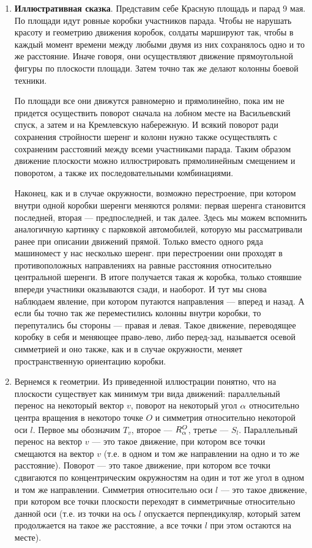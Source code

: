 \begin{enumerate}\setlength{\itemsep}{1pt}
\item \textbf{Иллюстративная сказка}. Представим себе Красную площадь и парад 9 мая. По площади идут ровные коробки участников парада. Чтобы не нарушать красоту и геометрию движения коробок, солдаты маршируют так, чтобы в каждый момент времени между любыми двумя из них сохранялось одно и то же расстояние. Иначе говоря, они осуществляют движение прямоугольной фигуры по плоскости площади. Затем точно так же делают колонны боевой техники.

По площади все они движутся равномерно и прямолинейно, пока им не придется осуществить поворот сначала на лобном месте на Васильевский спуск, а затем и на Кремлевскую набережную. И всякий поворот ради сохранения стройности шеренг и колонн нужно также осуществлять с сохраненим расстояний между всеми участниками парада. Таким образом движение плоскости можно иллюстрировать прямолинейным смещением и поворотом, а также их последовательными комбинациями.

Наконец, как и в случае окружности, возможно перестроение, при котором внутри одной коробки шеренги меняются ролями: первая шеренга становится последней, вторая --- предпоследней, и так далее. Здесь мы можем вспомнить аналогичную картинку с парковкой автомобилей, которую мы рассматривали ранее при описании движений прямой. Только вместо одного ряда машиномест у нас несколько шеренг. при перестроении они проходят в противоположных направлениях на равные расстояния относительно центральной шеренги. В итоге получается такая ж коробка, только стоявшие впереди участники оказываются сзади, и наоборот. И тут мы снова наблюдаем явление, при котором путаются направления --- вперед и назад. А если бы точно так же переместились колонны внутри коробки, то перепутались бы стороны --- правая и левая. Такое движение, переводящее коробку в себя и меняющее право-лево, либо перед-зад, называется осевой симметрией и оно также, как и в случае окружности, меняет пространственную ориентацию коробки.

\item Вернемся к геометрии.
Из приведенной иллюстрации понятно, что на плоскости существует как минимум три вида движений: параллельный перенос на некоторый вектор $v$, поворот на некоторый угол $\alpha$ относительно центра вращения в некоторо точке $O$ и симметрия относительно некоторой оси $l$. Первое мы обозначим $T_v$, второе --- $R^O_\alpha$, третье --- $S_l$. Параллельный перенос на вектор $v$ --- это такое движение, при котором все точки смещаются на вектор $v$ (т.е. в одном и том же направлении на одно и то же расстояние). Поворот --- это такое движение, при котором все точки сдвигаются по концентрическим окружностям на один и тот же угол в одном и том же направлении. Симметрия относительно оси $l$ --- это такое движение, при котором все точки плоскости переходят в симметричные относительно данной оси (т.е. из точки на ось $l$ опускается перпендикуляр, который затем продолжается на такое же расстояние, а все точки $l$ при этом остаются на месте).


\end{enumerate}
